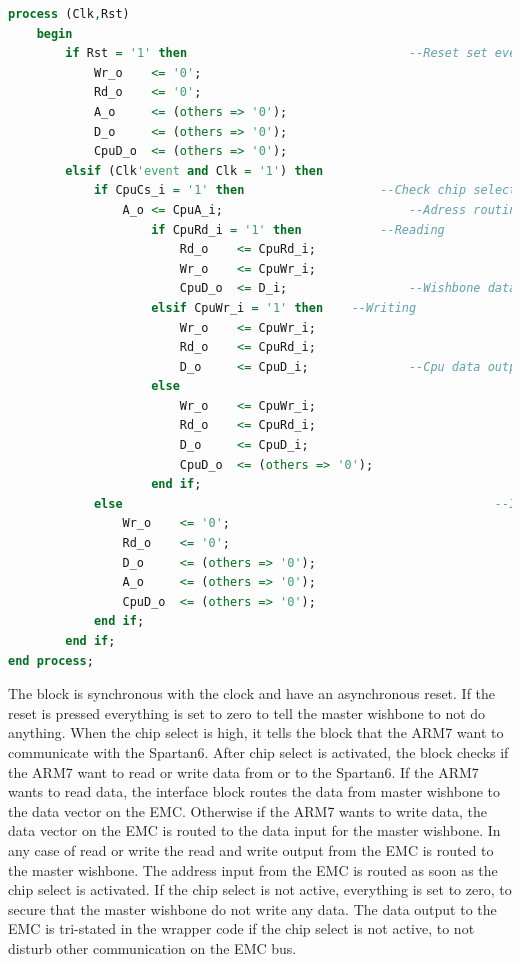 \begin{lstlisting}[language=VHDL]
process (Clk,Rst)
	begin  
		if Rst = '1' then								--Reset set everything to 0
			Wr_o	<= '0';
			Rd_o	<= '0';
			A_o		<= (others => '0');
			D_o		<= (others => '0');
			CpuD_o	<= (others => '0');
		elsif (Clk'event and Clk = '1') then
			if CpuCs_i = '1' then					--Check chip select
				A_o	<= CpuA_i;							--Adress routing
					if CpuRd_i = '1' then			--Reading
						Rd_o	<= CpuRd_i;
						Wr_o	<= CpuWr_i;
						CpuD_o	<= D_i;					--Wishbone data out to Cpu data input
					elsif CpuWr_i = '1' then	--Writing
						Wr_o	<= CpuWr_i;					
						Rd_o	<= CpuRd_i;
						D_o		<= CpuD_i;				--Cpu data output to wishbone data input
					else
						Wr_o	<= CpuWr_i;		
						Rd_o	<= CpuRd_i;
						D_o		<= CpuD_i;
						CpuD_o	<= (others => '0');
					end if;
			else													--If chip select not high everything is set to 0
				Wr_o	<= '0';	
				Rd_o	<= '0';
				D_o		<= (others => '0');
				A_o		<= (others => '0');
				CpuD_o	<= (others => '0');
			end if;
		end if;
end process;
\end{lstlisting}
The block is synchronous with the clock and have an asynchronous reset. If the reset is pressed everything is set to zero to tell the master wishbone to not do anything. When the chip select is high, it tells the block that the ARM7 want to communicate with the Spartan6. After chip select is activated, the block checks if the ARM7 want to read or write data from or to the Spartan6. If the ARM7 wants to read data, the interface block routes the data from master wishbone to the data vector on the EMC. Otherwise if the ARM7 wants to write data, the data vector on the EMC is routed to the data input for the master wishbone. In any case of read or write the read and write output from the EMC is routed to the master wishbone. The address input from the EMC is routed as soon as the chip select is activated. If the chip select is not active, everything is set to zero, to secure that the master wishbone do not write any data. The data output to the EMC is tri-stated in the wrapper code if the chip select is not active, to not disturb other communication on the EMC bus.
